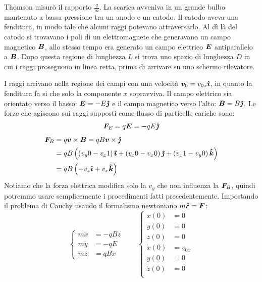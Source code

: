 Thomson misurò il rapporto $\frac{q}{m}$. La scarica avveniva in un grande bulbo mantenuto a bassa pressione tra un anodo e un catodo. Il catodo aveva una fenditura, in modo tale che alcuni raggi potevano attraversarlo. Al dì là del catodo si trovavano i poli di un elettromagnete che generavano un campo magnetico $\boldsymbol{B}$, allo stesso tempo era generato un campo elettrico $\boldsymbol{E}$ antiparallelo a $\boldsymbol{B}$. Dopo questa regione di lunghezza $L$ si trova uno spazio di lunghezza $D$ in cui i raggi proseguono in linea retta, prima di arrivare su uno schermo rilevatore.

I raggi arrivano nella regione dei campi con una velocità $\boldsymbol{v}_0=v_{0x}\boldsymbol{\hat {\imath}}$, in quanto la fenditura fa si che solo la componente $x$ sopravviva. Il campo elettrico sia orientato verso il basso: $\boldsymbol{E}=-E\boldsymbol{\hat {\jmath}}$ e il campo magnetico verso l'alto: $\boldsymbol{B}=B\boldsymbol{\hat {\jmath}}$. Le forze che agiscono sui raggi supposti come flusso di particelle cariche sono:
\begin{equation}
	\boldsymbol{F}_E=q\boldsymbol{E}=-qE\boldsymbol{\hat {\jmath}}\\
\end{equation}
\begin{equation}
	\begin{split}
		\boldsymbol{F}_B&=q\boldsymbol{v}\times\boldsymbol{B}=qB\boldsymbol{v}\times\boldsymbol{\hat {\jmath}}\\
		&=qB\left(\left(v_y 0-v_z 1\right)\boldsymbol{\hat {\imath}}+\left(v_z 0-v_x 0\right)\boldsymbol{\hat {\jmath}}+\left(v_x 1-v_y 0\right)\boldsymbol{\hat {k}}\right)\\
		&=qB\left(-v_z\boldsymbol{\hat {\imath}}+v_x\boldsymbol{\hat {k}}\right)
	\end{split}
\end{equation}
Notiamo che la forza elettrica modifica solo la $v_y$ che non influenza la $\boldsymbol{F}_B$, quindi potremmo usare semplicemente i procedimenti fatti precedentemente. Impostando il problema di Cauchy usando il formalismo newtoniano $m\ddot{\boldsymbol{r}}=\boldsymbol{F}$:
\begin{equation}
	\left\{
	\begin{aligned}
		m\ddot x & =-qB\dot z \\
		m\ddot y & =-qE       \\
		m\ddot z & =qB\dot x
	\end{aligned}
	\right.
	\qquad
	\left\{
	\begin{aligned}
		x(0)      & =0      \\
		y(0)      & =0      \\
		z(0)      & =0      \\
		\dot x(0) & =v_{0x} \\
		\dot y(0) & =0      \\
		\dot z(0) & =0      \\
	\end{aligned}
	\right.
\end{equation}
